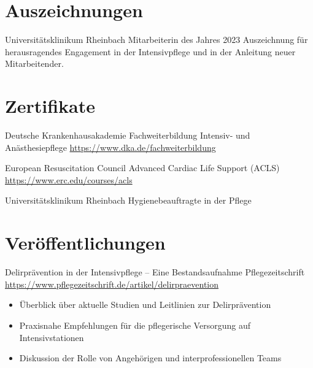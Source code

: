 \documentclass[a4paper, serif, 10pt]{moderncv}
\begin{document}
\section{Auszeichnungen}

        {Universitätsklinikum Rheinbach}
        {Mitarbeiterin des Jahres 2023}
        {}
        {}
        {Auszeichnung für herausragendes Engagement in der Intensivpflege und in der Anleitung neuer Mitarbeitender.}
\section{Zertifikate}

        {Deutsche Krankenhausakademie}
        {Fachweiterbildung Intensiv- und Anästhesiepflege}
        {\url{https://www.dka.de/fachweiterbildung}}
        {}
        {}

        {European Resuscitation Council}
        {Advanced Cardiac Life Support (ACLS)}
        {\url{https://www.erc.edu/courses/acls}}
        {}
        {}

        {Universitätsklinikum Rheinbach}
        {Hygienebeauftragte in der Pflege}
        {}
        {}
        {}
\section{Veröffentlichungen}

        {Delirprävention in der Intensivpflege – Eine Bestandsaufnahme}
        {Pflegezeitschrift}
        {\url{https://www.pflegezeitschrift.de/artikel/delirpraevention}}
        {}
        {\begin{itemize}
\item Überblick über aktuelle Studien und Leitlinien zur Delirprävention
\item Praxisnahe Empfehlungen für die pflegerische Versorgung auf Intensivstationen
\item Diskussion der Rolle von Angehörigen und interprofessionellen Teams
\end{itemize}}
\end{document}

